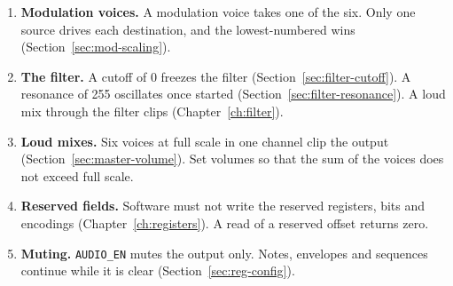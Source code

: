 \begin{enumerate}
	\item \textbf{Modulation voices.} A modulation voice takes one of the six. Only one source drives each destination, and
	      the lowest-numbered wins (Section~\ref{sec:mod-scaling}).
	\item \textbf{The filter.} A cutoff of 0 freezes the filter (Section~\ref{sec:filter-cutoff}). A resonance of 255
	      oscillates once started (Section~\ref{sec:filter-resonance}). A loud mix through the filter clips
	      (Chapter~\ref{ch:filter}).
	\item \textbf{Loud mixes.} Six voices at full scale in one channel clip the output (Section~\ref{sec:master-volume}).
	      Set volumes so that the sum of the voices does not exceed full scale.
	\item \textbf{Reserved fields.} Software must not write the reserved registers, bits and encodings
	      (Chapter~\ref{ch:registers}). A read of a reserved offset returns zero.
	\item \textbf{Muting.} \texttt{AUDIO\_EN} mutes the output only. Notes, envelopes and sequences continue while it is clear
	      (Section~\ref{sec:reg-config}).
\end{enumerate}

